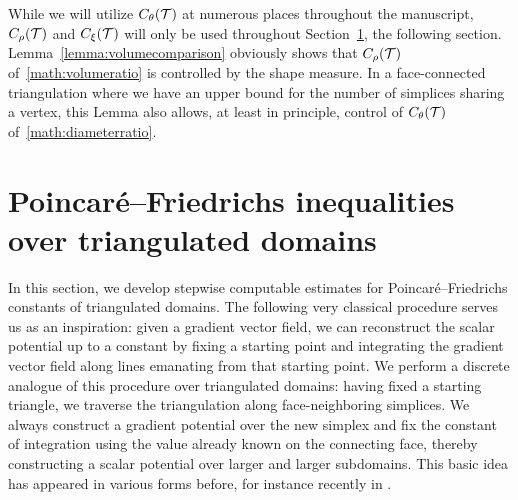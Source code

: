 \documentclass[10pt,a4paper]{article}
\begin{document}
\begin{remark}
    While we will utilize $C_\theta({\mathcal T})$ at numerous places throughout the manuscript, 
    $C_\rho({\mathcal T})$ and $C_\xi({\mathcal T})$ will only be used throughout Section~\ref{section:gradient},
    the following section.  
    Lemma~\ref{lemma:volumecomparison} obviously shows that $C_\rho({\mathcal T})$ of~\eqref{math:volumeratio} is controlled by the shape measure. In a face-connected triangulation where we have an upper bound for the number of simplices sharing a vertex, 
    this Lemma also allows, at least in principle, control of $C_\theta({\mathcal T})$ of~\eqref{math:diameterratio}.
\end{remark}










































\section{Poincar\'e--Friedrichs inequalities over triangulated domains}\label{section:gradient}

In this section, we develop stepwise computable estimates for Poincar\'e--Friedrichs constants of triangulated domains. 
The following very classical procedure serves us as an inspiration: given a gradient vector field, we can reconstruct the scalar potential up to a constant by fixing a starting point and integrating the gradient vector field along lines emanating from that starting point. 
We perform a discrete analogue of this procedure over triangulated domains: 
having fixed a starting triangle, we traverse the triangulation along face-neighboring simplices.
We always construct a gradient potential over the new simplex and fix the constant of integration using the value already known on the connecting face, thereby constructing a scalar potential over larger and larger subdomains.
This basic idea has appeared in various forms before, for instance recently in \cite{Brae_Pill_Sch_p_rob_09, ern2020stable, Chaum_Voh_p_rob_3D_H_curl_24, Voh_loc_glob_H1_24}.
\end{document}

